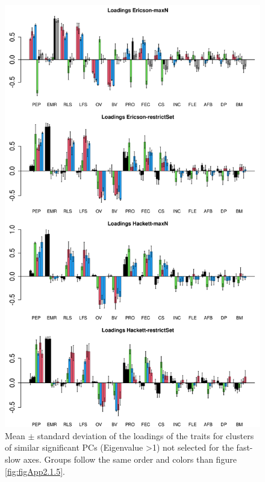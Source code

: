 \begin{figure}[ht!]
\centering
\includegraphics[width=.8\textwidth]{./Figures/Appendix2_1/2nd loadings plots-ALL.png}
\caption[LHT loadings of the secondary axes]{
Mean $\pm$ standard deviation of the loadings of the traits for clusters of
similar significant PCs (Eigenvalue \textgreater{1}) not selected for the
fast-slow axes. Groups follow the same order and colors than figure
\ref{fig:figApp2.1.5}.}
\label{fig:figApp2.1.3}
\end{figure}

